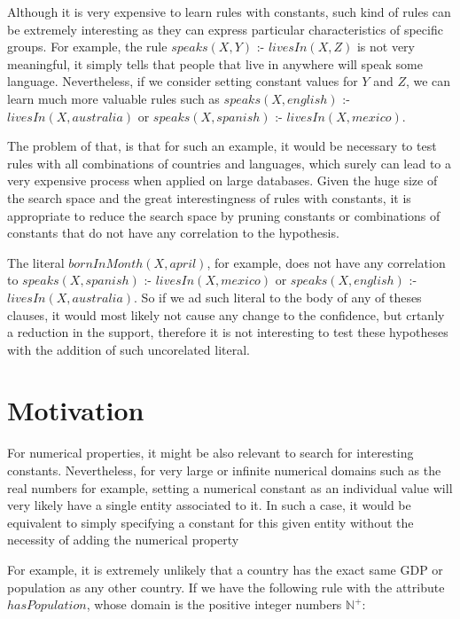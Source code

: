 Although it is very expensive to learn rules with constants, such kind of rules can be extremely interesting as they
can express particular characteristics of specific groups. For example, the rule $speaks(X,Y)$ :- $livesIn(X,Z)$ is not
very meaningful, it simply tells that people that live in anywhere will speak some language. Nevertheless, if we
consider setting constant values for $Y$ and $Z$, we can learn much more valuable rules such as
$speaks(X,english)$ :- $livesIn(X,australia)$ or $speaks(X,spanish)$ :- $livesIn(X,mexico)$.

The problem of that, is that for such an example, it would be necessary to test rules with all combinations of
countries and languages, which surely can lead to a very expensive process when applied on large databases. Given the
huge size of the search space and the great interestingness of rules with constants, it is appropriate to reduce the
search space by pruning constants or combinations of constants that do not have any correlation to the
hypothesis.

The literal $bornInMonth(X,april)$, for example, does not have any correlation  to $speaks(X,spanish )$ :-
$livesIn(X,mexico)$ or $speaks(X,english)$ :- $livesIn(X,australia)$. So if we ad such literal to the body of any of
theses clauses, it would most likely not cause any change to the confidence,  but crtanly a reduction in the support,
therefore it is not interesting to test these hypotheses with the addition of  such uncorelated literal.


\section{Motivation}

For numerical properties, it might be also relevant to search for interesting constants. Nevertheless, for very large
or infinite numerical domains such as the real numbers for example, setting a numerical constant as an individual
value will very likely have a single entity associated to it. In such a case, it would be equivalent to simply
specifying a constant for this given entity without the necessity of adding the numerical property

For example, it is extremely unlikely that a country has the exact same GDP or population as any other country. If we
have the following rule with the attribute $hasPopulation$, whose domain is the positive integer numbers
$\mathbb{N}^+$:

